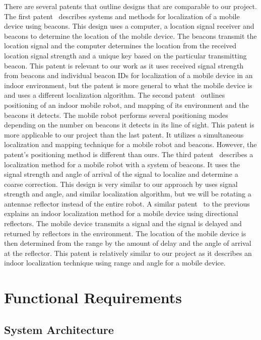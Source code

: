 \documentclass[letterpaper,12pt]{article}   %
\begin{document}
There are several patents that outline designs that are comparable to our project. The first patent~\cite{biehl} describes systems and methods for localization of a mobile device using beacons. This design uses a computer, a location signal receiver and beacons to determine the location of the mobile device. The beacons transmit the location signal and  the computer determines the location from the received location signal strength and a unique key based on the particular transmitting beacon. This patent is relevant to our work as it uses received signal strength from beacons and individual beacon IDs for localization of a mobile device in an indoor environment, but the patent is more general to what the mobile device is and uses a different localization algorithm. The second patent~\cite{lin} outlines positioning of an indoor mobile robot, and mapping of its environment and the beacons it detects. The mobile robot performs several positioning modes depending on the number on beacons it detects in its line of sight. This patent is more applicable to our project than the last patent. It utilizes a simultaneous localization and mapping technique for a mobile robot and beacons. However, the patent's positioning method is different than ours. The third patent~\cite{edlund} describes a localization method for a mobile robot with a system of beacons. It uses the signal strength and angle of arrival of the signal to localize and determine a coarse correction. This design is very similar to our approach by uses signal strength and angle, and similar localization algorithm, but we will be rotating a antennae reflector instead of the entire robot. A similar patent~\cite{younis} to the previous explains an indoor localization method for a mobile device using directional reflectors. The mobile device transmits a signal and the signal is delayed and returned by reflectors in the environment. The location of the mobile device is then determined from the range by the amount of delay and the angle of arrival at the reflector. This patent is relatively similar to our project as it describes an indoor localization technique using range and angle for a mobile device.

\section{Functional Requirements}

\subsection{System Architecture}
\end{document}
